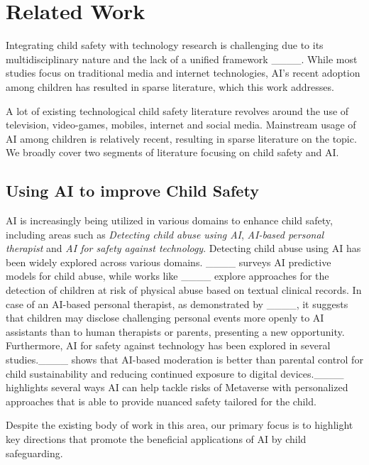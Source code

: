 \section{Related Work}
Integrating child safety with technology research is challenging due to its multidisciplinary nature and the lack of a unified framework ____. While most studies focus on traditional media and internet technologies, AI's recent adoption among children has resulted in sparse literature, which this work addresses.

A lot of existing technological child safety literature revolves around the use of television, video-games, mobiles, internet and social media. Mainstream usage of AI among children is relatively recent, resulting in sparse literature on the topic. We broadly cover two segments of literature focusing on child safety and AI.

\subsection{Using AI to improve Child Safety}
AI is increasingly being utilized in various domains to enhance child safety, including areas such as \textit{Detecting child abuse using AI}, \textit{AI-based personal therapist} and \textit{AI for safety against technology}. Detecting child abuse using AI has been widely explored across various domains. ____ surveys AI predictive models for child abuse, while works like ____ explore approaches for the detection of children at risk of physical abuse based on textual clinical records. In case of an AI-based personal therapist, as demonstrated by ____, it suggests that children may disclose challenging personal events more openly to AI assistants than to human therapists or parents, presenting a new opportunity. Furthermore, AI for safety against technology has been explored in several studies.____ shows that AI-based moderation is better than parental control for child sustainability and reducing continued exposure to digital devices.____ highlights several ways AI can help tackle risks of Metaverse with personalized approaches that is able to provide nuanced safety tailored for the child.


Despite the existing body of work in this area, our primary focus is to highlight key directions that promote the beneficial applications of AI by child safeguarding.



